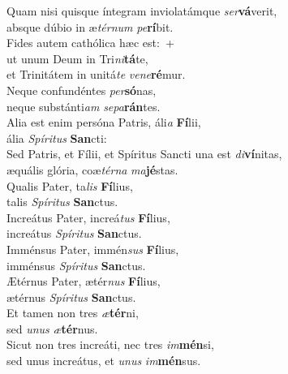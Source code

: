 \evenverse Quam nisi quisque íntegram inviolatámque \textit{ser}\textbf{vá}verit,~\*\\
\evenverse absque dúbio in æ\textit{tér}\textit{num} \textit{pe}\textbf{rí}bit.\\
\oddverse Fides autem cathólica hæc est:~+\\
\oddverse  ut unum Deum in Tri\textit{ni}\textbf{tá}te,~\*\\
\oddverse et Trinitátem in unitá\textit{te} \textit{ve}\textit{ne}\textbf{ré}mur.\\
\evenverse Neque confundéntes \textit{per}\textbf{só}nas,~\*\\
\evenverse neque substánti\textit{am} \textit{se}\textit{pa}\textbf{rán}tes.\\
\oddverse Alia est enim persóna Patris, áli\textit{a} \textbf{Fí}lii,~\*\\
\oddverse ália \textit{Spí}\textit{ri}\textit{tus} \textbf{San}cti:\\
\evenverse Sed Patris, et Fílii, et Spíritus Sancti una est \textit{di}\textbf{ví}nitas,~\*\\
\evenverse æquális glória, coæ\textit{tér}\textit{na} \textit{ma}\textbf{jé}stas.\\
\oddverse Qualis Pater, ta\textit{lis} \textbf{Fí}lius,~\*\\
\oddverse talis \textit{Spí}\textit{ri}\textit{tus} \textbf{San}ctus.\\
\evenverse Increátus Pater, increá\textit{tus} \textbf{Fí}lius,~\*\\
\evenverse increátus \textit{Spí}\textit{ri}\textit{tus} \textbf{San}ctus.\\
\oddverse Imménsus Pater, immén\textit{sus} \textbf{Fí}lius,~\*\\
\oddverse imménsus \textit{Spí}\textit{ri}\textit{tus} \textbf{San}ctus.\\
\evenverse Ætérnus Pater, ætér\textit{nus} \textbf{Fí}lius,~\*\\
\evenverse ætérnus \textit{Spí}\textit{ri}\textit{tus} \textbf{San}ctus.\\
\oddverse Et tamen non tres \textit{æ}\textbf{tér}ni,~\*\\
\oddverse sed \textit{u}\textit{nus} \textit{æ}\textbf{tér}nus.\\
\evenverse Sicut non tres increáti, nec tres \textit{im}\textbf{mén}si,~\*\\
\evenverse sed unus increátus, et \textit{u}\textit{nus} \textit{im}\textbf{mén}sus.\\

